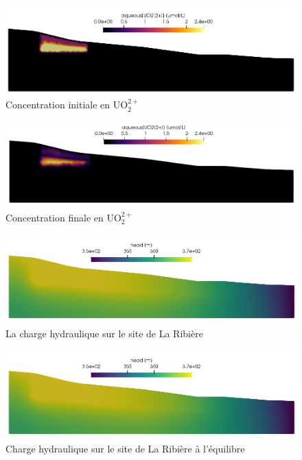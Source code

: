 \documentclass{article}
\begin{document}
\begin{figure}[H]
    \centering
    \includegraphics[width=\linewidth]{LJ-UO22P-initial.png}
    \caption{Concentration initiale en UO$_2^{2+}$}
    \label{fig:uo2P-initial}
\end{figure}
\begin{figure}[H]
    \centering
    \includegraphics[width=\linewidth]{LJ-UO22P-final.PNG}
    \caption{Concentration finale en UO$_2^{2+}$}
    \label{fig:uo2P-final}
\end{figure}
\newpage
\begin{figure}[H]
    \centering
    \includegraphics[width=\linewidth]{LJ-charge-hydraulique-finale.PNG}
    \caption{La charge hydraulique sur le site de La Ribière}
    \label{fig:charge_hydro_finale}
\end{figure}
\begin{figure}[H]
    \centering
    \includegraphics[width=\linewidth]{LJ-charge-hydraulique-finale.PNG}
    \caption{Charge hydraulique sur le site de La Ribière à l'équilibre}
    \label{fig:charge_hydro_finale}
\end{figure}
\end{document}
